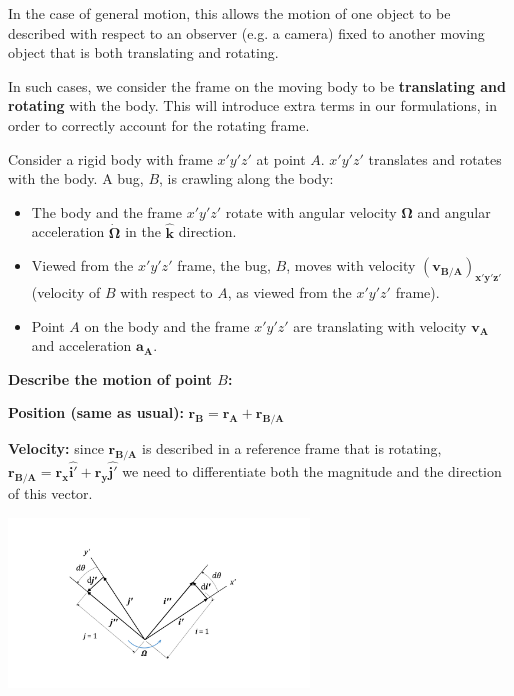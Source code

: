 \documentclass[12pt,letterpaper,twoside]{report}
\begin{document}
In the case of general motion, this allows the motion of one object to be described with respect to an observer (e.g. a camera) fixed to another moving object that is both translating and rotating. 

\vspace*{11\baselineskip}

In such cases, we consider the frame on the moving body to be \textbf{translating and rotating} with the body. This will introduce extra terms in our formulations, in order to correctly account for the rotating frame.  

Consider a rigid body with frame $x'y'z'$ at point $A$. $x'y'z'$ translates and rotates with the body.  A bug, $B$, is crawling along the body:

\vspace*{24\baselineskip}

\begin{itemize}
\item The body and the frame $x'y'z'$ rotate with angular velocity $\bm{\Omega}$ and angular acceleration $\bm{\dot{\Omega}}$ in the $\bm{\hat{k}}$ direction. 
\item Viewed from the $x'y'z'$ frame, the bug, $B$, moves with velocity $\bm{(v_{B/A})_{x'y'z'}}$ (velocity of $B$ with respect to $A$, as viewed from the $x'y'z'$ frame). 
\item Point $A$ on the body and the frame $x'y'z'$ are translating with velocity $\bm{v_A}$ and acceleration $\bm{a_A}$. 
\end{itemize}

\vspace*{2\baselineskip}

\textbf{Describe the motion of point $B$:}

\textbf{Position (same as usual):} $\bm{r_B} = \bm{r_A} +  \bm{r_{B/A}}$ 

\textbf{Velocity:} since $\bm{r_{B/A}}$ is described in a reference frame that is rotating, $\bm{r_{B/A}} = \bm{r_x \hat{i'}} + \bm{r_y \hat{j'}}$ we need to differentiate both the magnitude and the direction of this vector.  

\includegraphics[trim={4cm 3cm 5cm 3cm},clip,width=0.6\textwidth, center]{Slide31} 
\end{document}
